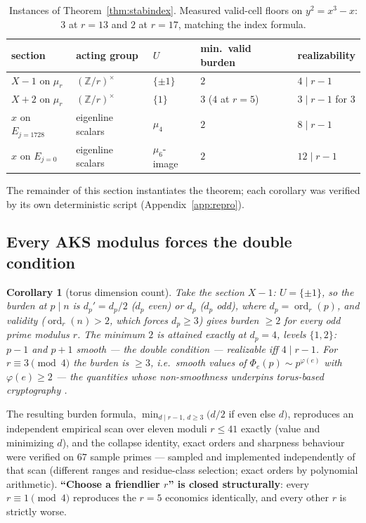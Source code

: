 \documentclass[11pt]{article}
\newtheorem{corollary}[theorem]{Corollary}
\theoremstyle{remark}
\newcommand{\Z}{\mathbb{Z}}
\DeclareMathOperator{\ord}{ord}
\begin{document}
\begin{table}[ht]\centering\small
\begin{tabular}{@{}lllll@{}}
\toprule
section & acting group & $U$ & min.\ valid burden & realizability \\
\midrule
$X - 1$ on $\mu_r$ & $(\Z/r)^\times$ & $\{\pm 1\}$ & $2$ &
$4 \mid r - 1$ \\
$X + 2$ on $\mu_r$ & $(\Z/r)^\times$ & $\{1\}$ & $3$ ($4$ at $r{=}5$) &
$3 \mid r - 1$ for $3$ \\
$x$ on $E_{j=1728}$ & eigenline scalars & $\mu_4$ & $2$ &
$8 \mid r - 1$ \\
$x$ on $E_{j=0}$ & eigenline scalars & $\mu_6$-image & $2$ &
$12 \mid r - 1$ \\
\bottomrule
\end{tabular}
\caption{Instances of Theorem~\ref{thm:stabindex}. Measured valid-cell
floors on $y^2 = x^3 - x$: $3$ at $r = 13$ and $2$ at $r = 17$, matching
the index formula.}
\label{tab:stab}
\end{table}

The remainder of this section instantiates the theorem; each corollary was
verified by its own deterministic script (Appendix~\ref{app:repro}).

\subsection{Every AKS modulus forces the double condition}

\begin{corollary}[torus dimension count]\label{cor:dimcount}
Take the section $X - 1$: $U = \{\pm 1\}$, so the burden at
$p \mid n$ is $d_p' = d_p/2$ ($d_p$ even) or $d_p$ ($d_p$ odd), where
$d_p = \ord_r(p)$, and validity ($\ord_r(n) > 2$, which forces
$d_p \ge 3$) gives burden $\ge 2$ for \emph{every} odd prime modulus $r$.
The minimum $2$ is attained exactly at $d_p = 4$, levels $\{1, 2\}$:
$p - 1$ and $p + 1$ smooth --- the double condition --- realizable iff
$4 \mid r - 1$. For $r \equiv 3 \pmod 4$ the burden is $\ge 3$, i.e.\
smooth values of $\Phi_e(p) \sim p^{\varphi(e)}$ with $\varphi(e) \ge 2$
--- the quantities whose non-smoothness underpins torus-based cryptography
\cite{RS}.
\end{corollary}

The resulting burden formula, $\min_{d \mid r-1,\, d \ge 3}(d/2$ if even
else $d)$, reproduces an independent empirical scan over eleven moduli
$r \le 41$ exactly (value and minimizing $d$), and the collapse identity,
exact orders and sharpness behaviour were verified on $67$ sample primes
--- sampled and implemented independently of that scan (different ranges
and residue-class selection; exact orders by polynomial arithmetic).
\textbf{``Choose a friendlier $r$'' is closed structurally}: every
$r \equiv 1 \pmod 4$ reproduces the $r = 5$ economics identically, and
every other $r$ is strictly worse.
\end{document}
